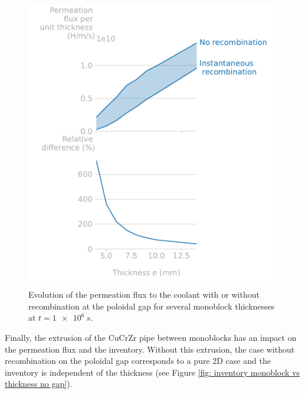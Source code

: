 \begin{figure} [h]
    \centering
    \includegraphics[width=\linewidth]{Figures/Chapter3/monoblocks/3D_monoblocks/permeation_flux_vs_thickness.pdf}
    \caption{Evolution of the permeation flux to the coolant with or without recombination at the poloidal gap for several monoblock thicknesses at $t=\SI{1e6}{s}$.}
    \label{fig: flux to coolant DEMO monoblock}
\end{figure}

Finally, the extrusion of the CuCrZr pipe between monoblocks has an impact on the permeation flux and the inventory.
Without this extrusion, the case without recombination on the poloidal gap corresponds to a pure 2D case and the inventory is independent of the thickness (see Figure \ref{fig: inventory monoblock vs thickness no gap}).

